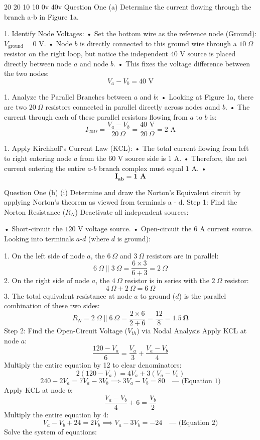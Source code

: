 20 20 10 10 0v 40v
Question One (a)
Determine the current flowing through the branch a-b in Figure 1a.

1. Identify Node Voltages:
 • Set the bottom wire as the reference node (Ground): $V_{\text{ground}} = 0\text{ V}$.
 • Node $b$ is directly connected to this ground wire through a $10\ \Omega$ resistor on the right loop, but notice the independent $40\text{ V}$ source is placed directly between node $a$ and node $b$.
 • This fixes the voltage difference between the two nodes:
$$V_a - V_b = 40\text{ V}$$ 

1. Analyze the Parallel Branches between $a$ and $b$:
 • Looking at Figure 1a, there are two $20\ \Omega$ resistors connected in parallel directly across nodes $a$and $b$.
 • The current through each of these parallel resistors flowing from $a$ to $b$ is:
$$I_{20\Omega} = \frac{V_a - V_b}{20\ \Omega} = \frac{40\text{ V}}{20\ \Omega} = 2\text{ A}$$ 

1. Apply Kirchhoff's Current Law (KCL):
 • The total current flowing from left to right entering node $a$ from the $60\text{ V}$ source side is $1\text{ A}$.
 • Therefore, the net current entering the entire $a\text{-}b$ branch complex must equal $1\text{ A}$.
 • $$\mathbf{I_{ab} = 1\text{ A}}$$ 


Question One (b) (i)
Determine and draw the Norton's Equivalent circuit by applying Norton's theorem as viewed from terminals a - d.
Step 1: Find the Norton Resistance ($R_N$)
Deactivate all independent sources:

• Short-circuit the $120\text{ V}$ voltage source.
• Open-circuit the $6\text{ A}$ current source.
Looking into terminals $a\text{-}d$ (where $d$ is ground):

1. On the left side of node $a$, the $6\ \Omega$ and $3\ \Omega$ resistors are in parallel:
$$6\ \Omega \parallel 3\ \Omega = \frac{6 \times 3}{6 + 3} = 2\ \Omega$$ 
2. On the right side of node $a$, the $4\ \Omega$ resistor is in series with the $2\ \Omega$ resistor:
$$4\ \Omega + 2\ \Omega = 6\ \Omega$$ 
3. The total equivalent resistance at node $a$ to ground ($d$) is the parallel combination of these two sides:
$$R_N = 2\ \Omega \parallel 6\ \Omega = \frac{2 \times 6}{2 + 6} = \frac{12}{8} = \mathbf{1.5\ \Omega}$$ 
Step 2: Find the Open-Circuit Voltage ($V_{th}$) via Nodal Analysis
Apply KCL at node $a$:
$$\frac{120 - V_a}{6} = \frac{V_a}{3} + \frac{V_a - V_b}{4}$$ 
Multiply the entire equation by 12 to clear denominators:
$$2(120 - V_a) = 4V_a + 3(V_a - V_b)$$ 
$$240 - 2V_a = 7V_a - 3V_b \implies 3V_a - V_b = 80 \quad \text{--- (Equation 1)}$$ 
Apply KCL at node $b$:
$$\frac{V_a - V_b}{4} + 6 = \frac{V_b}{2}$$ 
Multiply the entire equation by 4:
$$V_a - V_b + 24 = 2V_b \implies V_a - 3V_b = -24 \quad \text{--- (Equation 2)}$$ 
Solve the system of equations:

